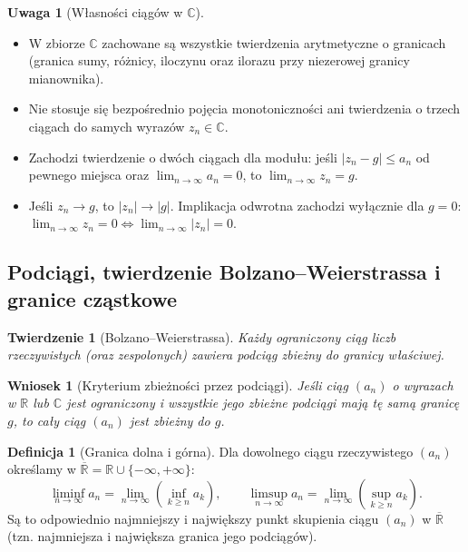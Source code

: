 \documentclass[11pt, a4paper]{article}
\theoremstyle{plain}
\newtheorem*{twierdzenie}{Twierdzenie}
\newtheorem*{wniosek}{Wniosek}
\theoremstyle{definition}
\newtheorem*{definicja}{Definicja}
\newtheorem*{uwaga}{Uwaga}
\begin{document}
\begin{uwaga}[Własności ciągów w $\mathbb{C}$]
\begin{itemize}
    \item W zbiorze $\mathbb{C}$ zachowane są wszystkie twierdzenia arytmetyczne o granicach (granica sumy, różnicy, iloczynu oraz ilorazu przy niezerowej granicy mianownika).
    \item Nie stosuje się bezpośrednio pojęcia monotoniczności ani twierdzenia o trzech ciągach do samych wyrazów $z_n \in \mathbb{C}$.
    \item Zachodzi twierdzenie o dwóch ciągach dla modułu: jeśli $\lvert z_n - g \rvert \leqslant a_n$ od pewnego miejsca oraz $\lim_{n\to\infty} a_n = 0$, to $\lim_{n\to\infty} z_n = g$.
    \item Jeśli $z_n \to g$, to $\lvert z_n \rvert \to \lvert g \rvert$. Implikacja odwrotna zachodzi wyłącznie dla $g = 0$: $\lim_{n\to\infty} z_n = 0 \iff \lim_{n\to\infty} \lvert z_n \rvert = 0$.
\end{itemize}
\end{uwaga}

\subsection{Podciągi, twierdzenie Bolzano--Weierstrassa i granice cząstkowe}

\begin{twierdzenie}[Bolzano--Weierstrassa]
Każdy ograniczony ciąg liczb rzeczywistych (oraz zespolonych) zawiera podciąg zbieżny do granicy właściwej.
\end{twierdzenie}

\begin{wniosek}[Kryterium zbieżności przez podciągi]
Jeśli ciąg $(a_n)$ o wyrazach w $\mathbb{R}$ lub $\mathbb{C}$ jest ograniczony i wszystkie jego zbieżne podciągi mają tę samą granicę $g$, to cały ciąg $(a_n)$ jest zbieżny do $g$.
\end{wniosek}

\begin{definicja}[Granica dolna i górna]
Dla dowolnego ciągu rzeczywistego $(a_n)$ określamy w $\overline{\mathbb{R}} = \mathbb{R} \cup \{-\infty, +\infty\}$:
\[
\liminf_{n\to\infty} a_n = \lim_{n\to\infty} \left(\inf_{k \geqslant n} a_k\right), \qquad \limsup_{n\to\infty} a_n = \lim_{n\to\infty} \left(\sup_{k \geqslant n} a_k\right).
\]
Są to odpowiednio najmniejszy i największy punkt skupienia ciągu $(a_n)$ w $\overline{\mathbb{R}}$ (tzn. najmniejsza i największa granica jego podciągów).
\end{definicja}
\end{document}
